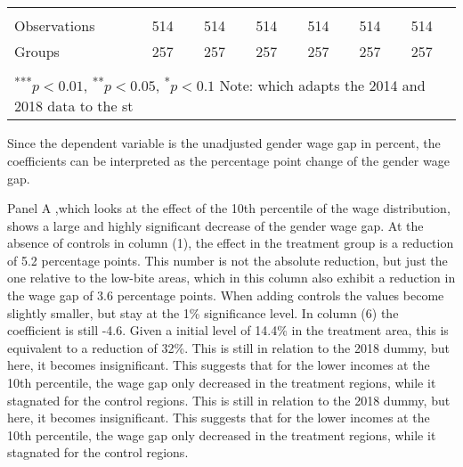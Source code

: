 \documentclass[12pt,draft,a4paper]{article}
\begin{document}
\begin{table}[htbp]
\begin{adjustbox}{width=\textwidth}
\begin{tabular}{l@{\hskip 10ex}llllll}
    & \\[-1.0em]
    \hline & \\[-1.0em]
    Observations              & 514       & 514       & 514       & 514       & 514       & 514       \\
    Groups                    & 257       & 257       & 257       & 257       & 257       & 257       \\
    \hline & \\[-1.0em]
    \multicolumn{7}{l}{
        \textsuperscript{***}$p < 0.01$, 
        \textsuperscript{**}$p < 0.05$, 
        \textsuperscript{*}$p < 0.1$     
        Note: which adapts the 2014 and 2018 data to the st}
    \end{tabular}
    \end{adjustbox}

    
    \label{tab:main}
    
    \end{table}

Since the dependent variable is the unadjusted gender wage gap in percent, the coefficients can be interpreted as  the percentage point change of the gender wage gap.

Panel A ,which looks at the effect of the 10th percentile of the wage distribution, shows a large and highly significant decrease of the gender wage gap. 
At the absence of controls in column (1), the effect in the treatment group is a reduction of 5.2 percentage points. This number is not the absolute reduction, but just the one relative to the low-bite areas, which in this column also exhibit a reduction in the wage gap of 3.6 percentage points.
When adding controls the values become slightly smaller, but stay at the 1\% significance level. In column (6) the coefficient is still -4.6. Given a initial level of 14.4\% in the treatment area, this is equivalent to a reduction of 32\%.
This is still in relation to the 2018 dummy, but here, it becomes insignificant. This suggests that for the lower incomes at the 10th percentile, the wage gap only decreased in the treatment regions, while it stagnated for the control regions.
This is still in relation to the 2018 dummy, but here, it becomes insignificant. This suggests that for the lower incomes at the 10th percentile, 
the wage gap only decreased in the treatment regions, while it stagnated for the control regions.
\end{document}
